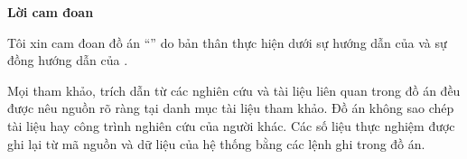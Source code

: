 \setcounter{page}{1}
\begin{center}
\textbf{\large{Lời cam đoan}	}
\end{center}
Tôi xin cam đoan đồ án ``\tendetaithuong{}'' do bản thân thực hiện dưới sự hướng dẫn của \gvhd{} và sự đồng hướng dẫn của \gvdhd{}.

Mọi tham khảo, trích dẫn từ các nghiên cứu và tài liệu liên quan trong đồ án đều được nêu nguồn rõ ràng tại danh mục tài liệu tham khảo. Đồ án không sao chép tài liệu hay công trình nghiên cứu của người khác. Các số liệu thực nghiệm được ghi lại từ mã nguồn và dữ liệu của hệ thống bằng các lệnh ghi trong đồ án.

